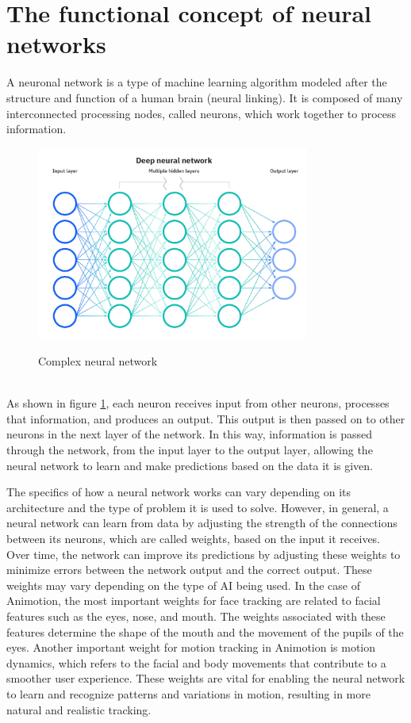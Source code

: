 \section{The functional concept of neural networks}
A neuronal network is a type of machine learning algorithm modeled 
after the structure and function of a human brain (neural linking). 
It is composed of many interconnected processing nodes, called neurons, 
which work together to process information. 
\\
\begin{figure}[htb]
    \centering
    \includegraphics[width=0.8\textwidth]{pics/neuralnetwork.jpg}
    \caption{Complex neural network}
    \label{fig:neuralnetwork}
    \cite{IBM}
\end{figure}
\\
As shown in figure \ref{fig:neuralnetwork}, each neuron receives input from other neurons, processes that information, 
and produces an output. This output is then passed on to other neurons in the next 
layer of the network. In this way, information is passed through the network, from the 
input layer to the output layer, allowing the neural network to learn and make predictions
based on the data it is given. \cite{book1}

The specifics of how a neural network works can vary depending on its architecture and the type of problem it is used to solve. 
However, in general, a neural network can learn from data by adjusting the strength of the connections between its neurons, which 
are called weights, based on the input it receives. Over time, the network can improve its predictions by adjusting these weights 
to minimize errors between the network output and the correct output. These weights may vary depending on the type of AI being used. In the case of Animotion, the most important weights for face 
tracking are related to facial features such as the eyes, nose, and mouth. The weights associated with these features determine 
the shape of the mouth and the movement of the pupils of the eyes.
Another important weight for motion tracking in Animotion is motion dynamics, 
which refers to the facial and body movements that contribute to a smoother 
user experience. These weights are vital for enabling the neural network to 
learn and recognize patterns and variations in motion, resulting in more 
natural and realistic tracking.

